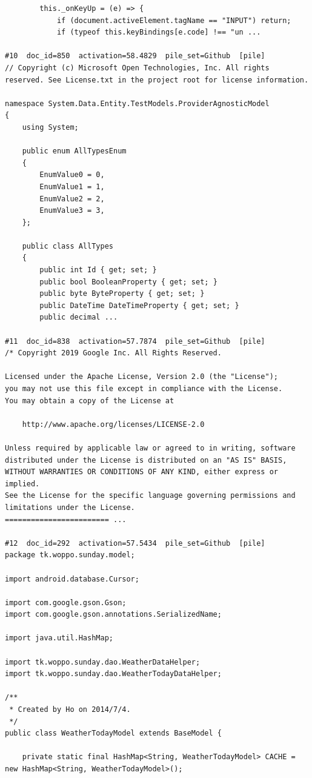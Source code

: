 \begin{verbatim}
        this._onKeyUp = (e) => {
            if (document.activeElement.tagName == "INPUT") return;
            if (typeof this.keyBindings[e.code] !== "un ...

#10  doc_id=850  activation=58.4829  pile_set=Github  [pile]
﻿// Copyright (c) Microsoft Open Technologies, Inc. All rights reserved. See License.txt in the project root for license information.

namespace System.Data.Entity.TestModels.ProviderAgnosticModel
{
    using System;

    public enum AllTypesEnum
    {
        EnumValue0 = 0,
        EnumValue1 = 1,
        EnumValue2 = 2,
        EnumValue3 = 3,
    };

    public class AllTypes
    {
        public int Id { get; set; }
        public bool BooleanProperty { get; set; }
        public byte ByteProperty { get; set; }
        public DateTime DateTimeProperty { get; set; }
        public decimal ...

#11  doc_id=838  activation=57.7874  pile_set=Github  [pile]
/* Copyright 2019 Google Inc. All Rights Reserved.

Licensed under the Apache License, Version 2.0 (the "License");
you may not use this file except in compliance with the License.
You may obtain a copy of the License at

    http://www.apache.org/licenses/LICENSE-2.0

Unless required by applicable law or agreed to in writing, software
distributed under the License is distributed on an "AS IS" BASIS,
WITHOUT WARRANTIES OR CONDITIONS OF ANY KIND, either express or implied.
See the License for the specific language governing permissions and
limitations under the License.
======================== ...

#12  doc_id=292  activation=57.5434  pile_set=Github  [pile]
package tk.woppo.sunday.model;

import android.database.Cursor;

import com.google.gson.Gson;
import com.google.gson.annotations.SerializedName;

import java.util.HashMap;

import tk.woppo.sunday.dao.WeatherDataHelper;
import tk.woppo.sunday.dao.WeatherTodayDataHelper;

/**
 * Created by Ho on 2014/7/4.
 */
public class WeatherTodayModel extends BaseModel {

    private static final HashMap<String, WeatherTodayModel> CACHE = new HashMap<String, WeatherTodayModel>();


\end{verbatim}
